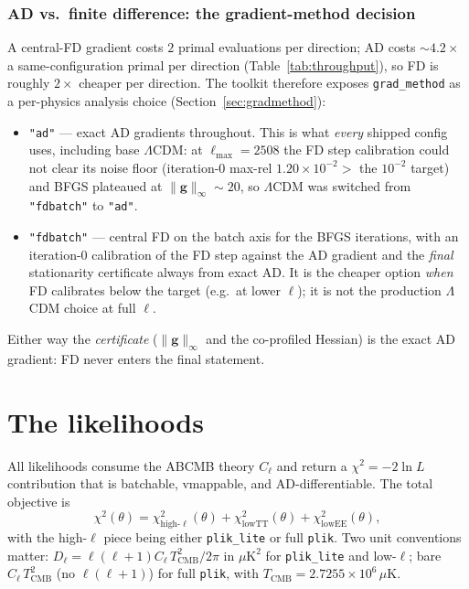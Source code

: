 \documentclass[11pt]{article}
\newcommand{\code}[1]{\texttt{\small #1}}
\newcommand{\Cl}{C_\ell}
\newcommand{\Dl}{D_\ell}
\newcommand{\chisq}{\chi^2}
\newcommand{\ginf}{\lVert \bm{g}\rVert_\infty}
\newcommand{\Lmax}{\ell_{\max}}
\newcommand{\Tcmb}{T_{\mathrm{CMB}}}
\begin{document}
\subsubsection{AD vs.\ finite difference: the gradient-method decision}
\label{sec:advsfd}

A central-FD gradient costs $2$ primal evaluations per direction; AD costs
$\sim4.2\times$ a same-configuration primal per direction
(Table~\ref{tab:throughput}), so FD is roughly $2\times$ cheaper per
direction. The toolkit therefore exposes \code{grad\_method} as a
per-physics analysis choice (Section~\ref{sec:gradmethod}):
\begin{itemize}[leftmargin=1.5em,itemsep=1pt]
\item \code{"ad"} --- exact AD gradients throughout. This is what
\emph{every} shipped config uses, including base $\Lambda$CDM: at
$\Lmax=2508$ the FD step calibration could not clear its noise floor
(iteration-0 max-rel $1.20\times10^{-2}>$ the $10^{-2}$ target) and BFGS
plateaued at $\ginf\sim20$, so $\Lambda$CDM was switched from
\code{"fdbatch"} to \code{"ad"}.
\item \code{"fdbatch"} --- central FD on the batch axis for the BFGS
iterations, with an iteration-0 calibration of the FD step against the AD
gradient and the \emph{final} stationarity certificate always from exact
AD. It is the cheaper option \emph{when} FD calibrates below the target
(e.g.\ at lower $\ell$); it is not the production $\Lambda$CDM choice at
full $\ell$.
\end{itemize}
Either way the \emph{certificate} ($\ginf$ and the co-profiled Hessian) is
the exact AD gradient: FD never enters the final statement.

\section{The likelihoods}
\label{sec:like}

All likelihoods consume the \textsc{ABCMB} theory $\Cl$ and return a
$\chisq=-2\ln L$ contribution that is batchable, vmappable, and
AD-differentiable. The total objective is
\begin{equation}
\chisq(\theta)=\chisq_{\mathrm{high\text{-}\ell}}(\theta)
+\chisq_{\mathrm{lowTT}}(\theta)+\chisq_{\mathrm{lowEE}}(\theta),
\end{equation}
with the high-$\ell$ piece being either \code{plik\_lite} or full
\code{plik}. Two unit conventions matter:
$\Dl=\ell(\ell+1)\Cl\,\Tcmb^2/2\pi$ in $\mu\mathrm{K}^2$ for
\code{plik\_lite} and low-$\ell$; bare $\Cl\,\Tcmb^2$ (no $\ell(\ell+1)$)
for full \code{plik}, with $\Tcmb=2.7255\times10^6\,\mu\mathrm{K}$.
\end{document}
